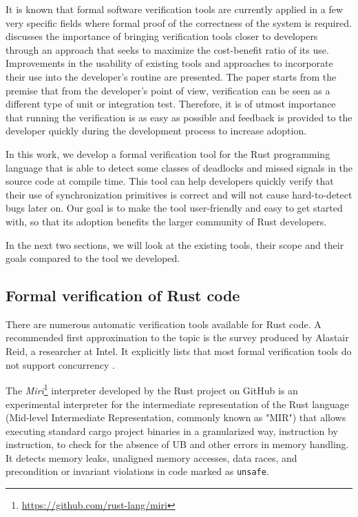 \documentclass[../Thesis.tex]{subfiles}
\begin{document}
It is known that formal software verification tools are currently applied
in a few very specific fields where
formal proof of the correctness of the system is required.
\cite{reid:hatra:2020} discusses the importance of bringing verification
tools closer to developers through an approach
that seeks to maximize the cost-benefit ratio of its use.
Improvements in the usability of existing tools and
approaches to incorporate their use into the developer's routine are presented.
The paper starts from the premise that from the developer's point of view,
verification can be seen as a different type of unit or integration test.
Therefore, it is of utmost importance that running the verification is as easy as possible
and feedback is provided to the developer quickly during the development process
to increase adoption.

In this work, we develop a formal verification tool
for the Rust programming language that is able to detect some classes of deadlocks
and missed signals in the source code at compile time.
This tool can help developers quickly verify
that their use of synchronization primitives
is correct and will not cause hard-to-detect bugs later on.
Our goal is to make the tool user-friendly and easy to get started with,
so that its adoption benefits the larger community of Rust developers.

In the next two sections, we will look at the existing tools,
their scope and their goals compared to the tool we developed.

\subsection{Formal verification of Rust code}

There are numerous automatic verification tools available for Rust code.
A recommended first approximation to the topic is
the survey produced by Alastair Reid, a researcher at Intel.
It explicitly lists that most formal verification tools
do not support concurrency \cite{reid2021}.

The \emph{Miri}\footnote{\url{https://github.com/rust-lang/miri}} interpreter
developed by the Rust project on GitHub is an experimental interpreter
for the intermediate representation of the Rust language
(Mid-level Intermediate Representation, commonly known as "MIR")
that allows executing standard cargo project binaries
in a granularized way, instruction by instruction,
to check for the absence of \acrfull{UB}
and other errors in memory handling.
It detects memory leaks, unaligned memory accesses, data races,
and precondition or invariant violations in code marked as \texttt{unsafe}.
\end{document}
